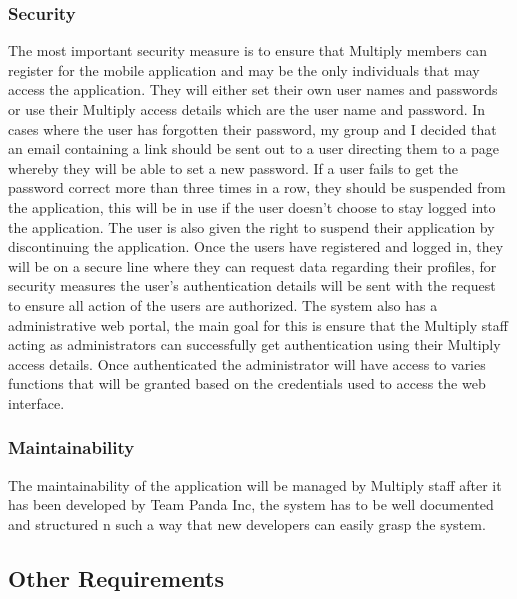 \documentclass[11pt]{article}
\begin{document}
\subsubsection{Security}
The most important security measure is to ensure that Multiply members can register for the mobile application and may be the only individuals that may access the application. They will either set their own user names and passwords or use their Multiply access details which are the user name and password.
In cases where the user has forgotten their password, my group and I decided that an email containing a link should be sent out to a user directing them to a page whereby they will be able to set a new password. If a user fails to get the password correct more than three times in a row, they should be suspended from the application, this will be in use if the user doesn't choose to stay logged into the application. The user is also given the right to suspend their application by discontinuing the application. Once the users have registered and logged in, they will be on a secure line where they can request data regarding their profiles, for security measures the user's authentication details will be sent with the request to ensure all action of the users are authorized. The system also has a administrative web portal, the main goal for this is ensure that the Multiply staff acting as administrators can successfully get authentication using their Multiply access details. Once authenticated the administrator will have access to varies functions that will be granted based on the credentials used to access the web interface.  
\subsubsection{Maintainability}
The maintainability of the application will be managed by Multiply staff after it has been developed by Team Panda Inc, the system has to be well documented and structured n such a way that new developers can easily grasp the system.
\subsection{Other Requirements}
\end{document}
